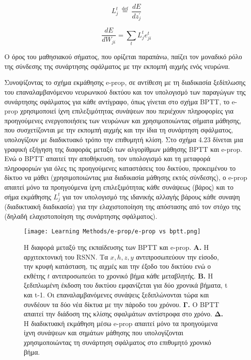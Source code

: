 \documentclass[12pt]{report}
\begin{document}
\begin{equation}
    L_{j}^{t} \stackrel{\text { def }}{=} \frac{d E}{d z_{j}^{\prime}}
\end{equation}

\begin{equation}
    \frac{d E}{d W_{j i}}=\sum_{t} L_{j}^{t} e_{j i}^{t}
\end{equation}

Ο όρος του μαθησιακού σήματος, που ορίζεται παραπάνω, παίζει τον μοναδικό ρόλο της σύνδεσης της συνάρτησης σφάλματος με την εκπομπή αιχμής ενός νευρώνα.

Συνοψίζοντας το σχήμα εκμάθησης \textlatin{e-prop}, σε αντίθεση με τη διαδικασία ξεδίπλωσης του επαναλαμβανόμενου νευρωνικού δικτύου και τον υπολογισμό των παραγώγων της συνάρτησης σφάλματος για κάθε αντίγραφο, όπως γίνεται στο σχήμα \textlatin{BPTT}, το \textlatin{e-prop} χρησιμοποιεί ίχνη επιλεξιμότητας συνάψεων που περιέχουν πληροφορίες για προηγούμενες ενεργοποιήσεις των νευρώνων και χρησιμοποιώντας σήματα μάθησης, που συσχετίζονται με την εκπομπή αιχμής και την ίδια τη συνάρτηση σφάλματος, υπολογίζουν με διαδικτυακό τρόπο την επιθυμητή κλίση. Στο σχήμα 4.23 δίνεται μια γραφική εξήγηση της διαφοράς μεταξύ των αλγορίθμων μάθησης \textlatin{BPTT} και \textlatin{e-prop}. Ενώ ο \textlatin{BPTT} απαιτεί την αποθήκευση, τον υπολογισμό και τη μεταφορά πληροφοριών για όλες τις προηγούμενες καταστάσεις του δικτύου, προκειμένου το δίκτυο να μάθει (χρησιμοποιώντας μια διαδικασία μάθησης εκτός σύνδεσης), ο \textlatin{e-prop} απαιτεί μόνο τα προηγούμενα ίχνη επιλεξιμότητας κάθε συνάψεως (βάρος) και το σήμα εκμάθησης \(L_j^t\) για τον υπολογισμό της ιδανικής αλλαγής βάρους κάθε συναψη (διαδικτυακή διαδικασία) για την ελαχιστοποίηση της απόστασης από τον στόχο της (δηλαδή ελαχιστοποίηση της συνάρτησης σφάλματος).

\begin{figure}[htp]
    \centering
    \texttt{[image: Learning Methods/e-prop/e-prop vs bptt.png]}
    \caption{\footnotesize Η διαφορά μεταξύ της εκπαίδευσης των \textlatin{BPTT} και \textlatin{e-prop}. \textbf{Α.} Η αρχιτεκτονική του \textlatin{RSNN}. Τα \(x, h, z, y\) αντιπροσωπεύουν την είσοδο, την κρυφή κατάσταση, τις αιχμές και την έξοδο του δικτύου ενώ ο εκθέτης \(t\) αντιπροσωπεύει το χρονικό βήμα κάθε μεταβλητής. \textbf{Β.} Η ξεδιπλωμένη έκδοση του δικτύου εμφανίζεται για δύο χρονικά βήματα, \textlatin{t} και \textlatin{t-1}. Οι επαναλαμβανόμενες συνάψεις ξεδιπλώνονται τώρα και συνδέουν τα δύο νέα δίκτυα με την πάροδο του χρόνου. \textbf{Γ.} Ο \textlatin{BPTT} απαιτεί την διάδοση της κλίσης σφαλμάτων αντίστροφα στο χρόνο. \textbf{Δ.} Η διαδικτυακή εκμάθηση μέσω \textlatin{e-prop} απαιτεί μόνο τα προηγούμενα ίχνη συνάψεων και σημάτων μάθησης που υπολογίζονται χρησιμοποιώντας τη συνάρτηση σφάλματος στο επιθυμητό χρονικό βήμα.
    \label{fig:readout}}
\end{figure}
\end{document}
